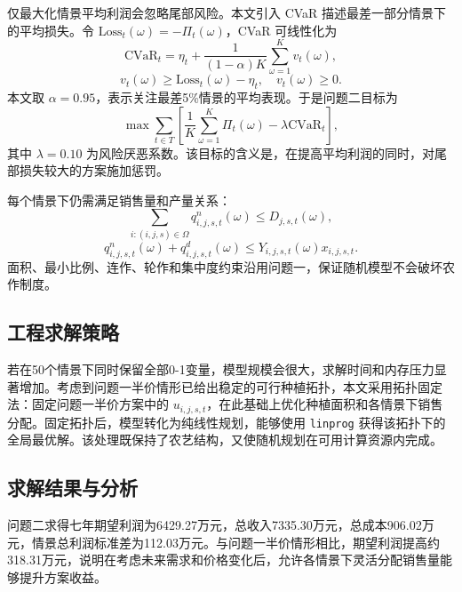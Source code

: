 仅最大化情景平均利润会忽略尾部风险。本文引入 CVaR 描述最差一部分情景下的平均损失。令 $\mathrm{Loss}_t(\omega)=-\Pi_t(\omega)$，CVaR 可线性化为
\begin{equation}
\mathrm{CVaR}_t=\eta_t+\frac{1}{(1-\alpha)K}\sum_{\omega=1}^{K}v_t(\omega),
\end{equation}
\begin{equation}
v_t(\omega)\ge \mathrm{Loss}_t(\omega)-\eta_t,\quad v_t(\omega)\ge 0.
\end{equation}
本文取 $\alpha=0.95$，表示关注最差5\%情景的平均表现。于是问题二目标为
\begin{equation}
\max \sum_{t\in T}\left[\frac{1}{K}\sum_{\omega=1}^{K}\Pi_t(\omega)-\lambda \mathrm{CVaR}_t\right],
\end{equation}
其中 $\lambda=0.10$ 为风险厌恶系数。该目标的含义是，在提高平均利润的同时，对尾部损失较大的方案施加惩罚。

每个情景下仍需满足销售量和产量关系：
\begin{equation}
\sum_{i:(i,j,s)\in\Omega}q^n_{i,j,s,t}(\omega)\le D_{j,s,t}(\omega),
\end{equation}
\begin{equation}
q^n_{i,j,s,t}(\omega)+q^d_{i,j,s,t}(\omega)\le
Y_{i,j,s,t}(\omega)x_{i,j,s,t}.
\end{equation}
面积、最小比例、连作、轮作和集中度约束沿用问题一，保证随机模型不会破坏农作制度。

\subsection{工程求解策略}

若在50个情景下同时保留全部0-1变量，模型规模会很大，求解时间和内存压力显著增加。考虑到问题一半价情形已给出稳定的可行种植拓扑，本文采用拓扑固定法：固定问题一半价方案中的 $u_{i,j,s,t}$，在此基础上优化种植面积和各情景下销售分配。固定拓扑后，模型转化为纯线性规划，能够使用 \texttt{linprog} 获得该拓扑下的全局最优解。该处理既保持了农艺结构，又使随机规划在可用计算资源内完成。

\subsection{求解结果与分析}

问题二求得七年期望利润为6429.27万元，总收入7335.30万元，总成本906.02万元，情景总利润标准差为112.03万元。与问题一半价情形相比，期望利润提高约318.31万元，说明在考虑未来需求和价格变化后，允许各情景下灵活分配销售量能够提升方案收益。

